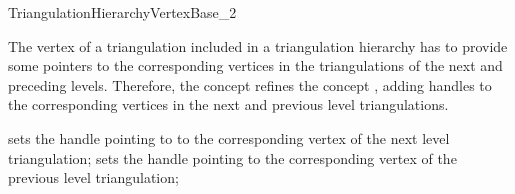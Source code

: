 

\begin{ccRefConcept}{TriangulationHierarchyVertexBase_2}


\ccDefinition 
The vertex of a triangulation  
included in a  triangulation hierarchy has to provide
some pointers to the corresponding vertices in the
triangulations of the next and preceding levels.
Therefore, the concept 
refines the concept ,
adding handles to the corresponding vertices in the
next and previous level triangulations.



\ccRefines
{}




\ccOperations
{}
\ccGlue
{}
\ccGlue
{}
{sets the handle pointing to  to the corresponding vertex
of the next level triangulation;} 
\ccGlue 
{}
{sets the handle pointing  to the corresponding vertex
of the previous level triangulation;}

\ccHasModels
{}

\ccSeeAlso
{} 


\end{ccRefConcept}


